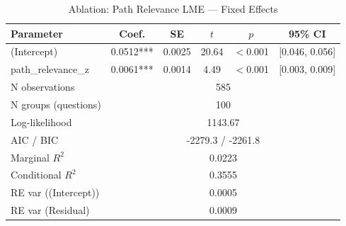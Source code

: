 \begin{table}[htbp]
\centering
\small
\caption{Ablation: Path Relevance LME --- Fixed Effects}
\label{tab:lme_ablation_pr_table}
\begin{tabular}{lccccc}
\toprule
Parameter & Coef. & SE & $t$ & $p$ & 95\% CI \\
\midrule
  (Intercept) & 0.0512*** & 0.0025 & 20.64 & $<$0.001 & [0.046, 0.056] \\
  path\_relevance\_z & 0.0061*** & 0.0014 & 4.49 & $<$0.001 & [0.003, 0.009] \\
\midrule
  N observations & \multicolumn{5}{c}{585} \\
  N groups (questions) & \multicolumn{5}{c}{100} \\
  Log-likelihood & \multicolumn{5}{c}{1143.67} \\
  AIC / BIC & \multicolumn{5}{c}{-2279.3 / -2261.8} \\
  Marginal $R^2$ & \multicolumn{5}{c}{0.0223} \\
  Conditional $R^2$ & \multicolumn{5}{c}{0.3555} \\
  RE var ((Intercept)) & \multicolumn{5}{c}{0.0005} \\
  RE var (Residual) & \multicolumn{5}{c}{0.0009} \\
\bottomrule
\end{tabular}
\end{table}
